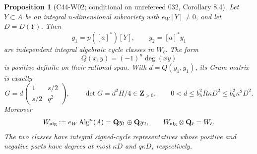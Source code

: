 \documentclass[11pt]{article}
\newtheorem{proposition}[theorem]{Proposition}
\theoremstyle{remark}\newtheorem{remark}[theorem]{Remark}
\begin{document}
\begin{proposition}[C44-W02; conditional on unrefereed 032, Corollary 8.4]
Let $Y\subset A$ be an integral $n$-dimensional subvariety with
$e_W[Y]\ne0$, and let $D=D(Y)$.  Then
\[
 y_1=p([a]^*)[Y],\qquad y_2=[a]^*y_1
\]
are independent integral algebraic cycle classes in $W_\ell$.
The form
\[
 Q(x,y)=(-1)^n\deg(xy)
\]
is positive definite on their rational span.  With $d=Q(y_1,y_1)$,
its Gram matrix is exactly
\begin{equation}\label{c44:weil-gram}
 G=d\begin{pmatrix}1&s/2\\s/2&q^2\end{pmatrix},\qquad
 \det G=d^2H/4\in\mathbf Z_{>0},\qquad
 0<d\leq b_h^2R\kappa D^2\leq b_h^2\kappa^2D^2.
\end{equation}
Moreover
\[
 W_{\rm alg}:=e_W\operatorname{Alg}^n(A)
    =\mathbf Qy_1\oplus\mathbf Qy_2,
 \qquad W_{\rm alg}\otimes\mathbf Q_\ell=W_\ell.
\]
The two classes have integral signed-cycle representatives whose
positive and negative parts have degrees at most $\kappa D$ and
$q\kappa D$, respectively.
\end{proposition}
\end{document}

